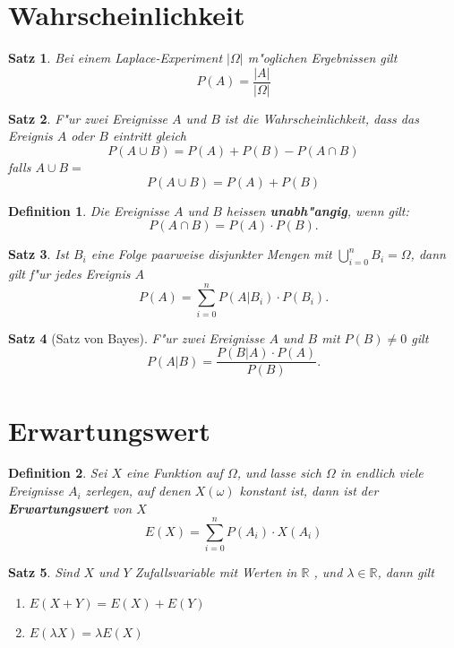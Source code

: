 \documentclass[ngerman, a4paper, 10pt, twocolumn, DIV20, headings=small]{scrartcl}
\newtheorem{definition}{Definition}
\newtheorem{satz}{Satz}
\begin{document}
\section{Wahrscheinlichkeit}
\label{sec:wahrscheinlichkeit}

\begin{satz}
  Bei einem Laplace-Experiment $| \Omega |$ m"oglichen Ergebnissen gilt
\[
P(A) = \frac{|A|}{|\Omega|}
\]
\end{satz}

\begin{satz}
F"ur zwei Ereignisse $A$ und $B$ ist die Wahrscheinlichkeit, dass das Ereignis $A$ oder $B$ eintritt gleich
\[
P(A\cup B) = P(A) + P(B) - P(A\cap B)
\]
falls $ A \cup B = {} $
\[
P(A\cup B) = P(A) + P(B)
\]
\end{satz}

\begin{definition}
Die Ereignisse $A$ und $B$ heissen {\bf unabh"angig}, wenn gilt:
\[
P(A\cap B) = P(A)\cdot P(B).
\]
\end{definition}

\begin{satz}
Ist $B_i$ eine Folge paarweise disjunkter Mengen mit $\bigcup_{i=0}^{n}B_i=\Omega$, dann gilt f"ur jedes Ereignis $A$
\[
P(A)=\sum_{i=0}^{n}P(A|B_i)\cdot P(B_i).
\]
\end{satz}

\begin{satz}[Satz von Bayes]
F"ur zwei Ereignisse $A$ und $B$ mit $P(B)\ne0$ gilt
\[
P(A|B)=\frac{P(B|A)\cdot P(A)}{P(B)}.
\]
\end{satz}

\section{Erwartungswert}
\label{sec:erwartungswert}


\begin{definition}
Sei $X$ eine Funktion auf $\Omega$, und lasse sich $\Omega$ in endlich
viele Ereignisse $A_i$ zerlegen, auf denen $X(\omega)$ konstant ist,
dann ist der {\bf Erwartungswert} von $X$
\[
E(X)=\sum_{i=0}^nP(A_i)\cdot X(A_i)
\]
\end{definition}

\begin{satz}
\label{rechenregeln-erwartungswert}
Sind $X$ und $Y$ Zufallsvariable mit Werten in $\mathbb{R}$ ,
und $\lambda\in\mathbb{R}$, dann gilt
\begin{enumerate}
\item $E(X+Y)=E(X)+E(Y)$
\item $E(\lambda X)=\lambda E(X)$

\end{enumerate}
\end{satz}
\end{document}
